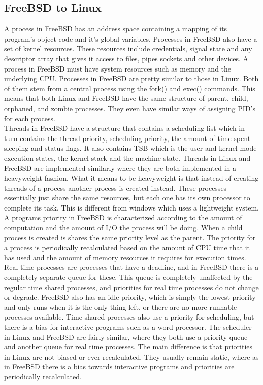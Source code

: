 \documentclass[onecolumn, draftclsnofoot, 10pt, titlepage, compsoc]{IEEEtran}
\begin{document}
\subsection{FreeBSD to Linux}
A process in FreeBSD has an address space containing a mapping of its program’s object code and it’s global variables. Processes in FreeBSD also have a set of kernel resources. These resources include credentials, signal state and any descriptor array that gives it access to files, pipes sockets and other devices. A process in FreeBSD must have system resources such as memory and the underlying CPU. Processes in FreeBSD are pretty similar to those in Linux. Both of them stem from a central process using the fork() and exec() commands. This means that both Linux and FreeBSD have the same structure of parent, child, orphaned, and zombie processes. They even have similar ways of assigning PID’s for each process.\\
Threads in FreeBSD have a structure that contains a scheduling list which in turn contains the thread priority, scheduling priority, the amount of time spent sleeping and status flags. It also contains TSB which is the user and kernel mode execution states, the kernel stack and the machine state. Threads in Linux and FreeBSD are implemented similarly where they are both implemented in a heavyweight fashion. What it means to be heavyweight is that instead of creating threads of a process another process is created instead. These processes essentially just share the same resources, but each one has its own processor to complete its task. This is different from windows which uses a lightweight system.\\
A programs priority in FreeBSD is characterized according to the amount of computation and the amount of I/O the process will be doing. When a child process is created is shares the same priority level as the parent. The priority for a process is periodically recalculated based on the amount of CPU time that it has used and the amount of memory resources it requires for execution times. Real time processes are processes that have a deadline, and in FreeBSD there is a completely separate queue for these. This queue is completely unaffected by the regular time shared processes, and priorities for real time processes do not change or degrade. FreeBSD also has an idle priority, which is simply the lowest priority and only runs when it is the only thing left, or there are no more runnable processes available. Time shared processes also use a priority for scheduling, but there is a bias for interactive programs such as a word processor. The scheduler in Linux and FreeBSD are fairly similar, where they both use a priority queue and another queue for real time processes. The main difference is that priorities in Linux are not biased or ever recalculated. They usually remain static, where as in FreeBSD there is a bias towards interactive programs and priorities are periodically recalculated.\\
\end{document}
